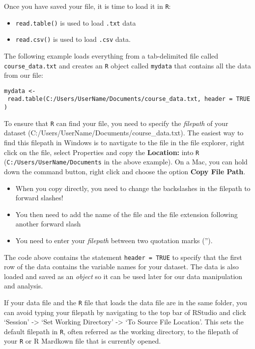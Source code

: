 \documentclass[
]{article}
\providecommand{\tightlist}{%
  \setlength{\itemsep}{0pt}\setlength{\parskip}{0pt}}
\begin{document}
Once you have saved your file, it is time to load it in \texttt{R}:

\begin{itemize}
\tightlist
\item
  \texttt{read.table()} is used to load \texttt{.txt} data
\item
  \texttt{read.csv()} is used to load \texttt{.csv} data.
\end{itemize}

The following example loads everything from a tab-delimited file called
\texttt{course\_data.txt} and creates an \texttt{R} object called
\texttt{mydata} that contains all the data from our file:

\texttt{mydata\ \textless{}-\ read.table(\textquotesingle{}C:/Users/UserName/Documents/course\_data.txt\textquotesingle{},\ header\ =\ TRUE)}

To ensure that \texttt{R} can find your file, you need to specify the
\emph{filepath} of your dataset
(C:/Users/UserName/Documents/course\_data.txt). The easiest way to find
this filepath in Windows is to navtigate to the file in the file
explorer, right click on the file, select Properties and copy the
\textbf{Location:} into \texttt{R} (\texttt{C:/Users/UserName/Documents}
in the above example). On a Mac, you can hold down the command button,
right click and choose the option \textbf{Copy File Path}.

\begin{itemize}
\item
  When you copy directly, you need to change the backslashes in the
  filepath to forward slashes!
\item
  You then need to add the name of the file and the file extension
  following another forward slash
\item
  You need to enter your \emph{filepath} between two quotation marks
  ('').
\end{itemize}

The code above contains the statement \texttt{header\ =\ TRUE} to
specify that the first row of the data contains the variable names for
your dataset. The data is also loaded and saved as an \emph{object} so
it can be used later for our data manipulation and analysis.

If your data file and the \texttt{R} file that loads the data file are
in the same folder, you can avoid typing your filepath by navigating to
the top bar of RStudio and click `Session' -\textgreater{} `Set Working
Directory' -\textgreater{} `To Source File Location'. This sets the
default filepath in \texttt{R}, often referred as the working directory,
to the filepath of your \texttt{R} or R Mardkown file that is currently
opened.
\end{document}
